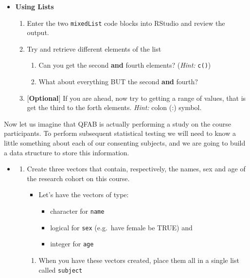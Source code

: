 \documentclass[a4paper]{book}
\providecommand{\tightlist}{%
  \setlength{\itemsep}{0pt}\setlength{\parskip}{0pt}}
\newenvironment{rmdblock}[1]
  {\vspace{1.5em}\begin{shaded*}
  \begin{itemize}
  \renewcommand{\labelitemi}{
    \raisebox{-.7\height}[0pt][0pt]{
      {\setkeys{Gin}{width=3em,keepaspectratio}\texttt{[image: images/\#1]}}
    }
  }
  \item
  }
  {
  \end{itemize}
  \end{shaded*}
  }
\newenvironment{rmdexercise}
  {\begin{rmdblock}{exercise}}
  {\end{rmdblock}}
\begin{document}
\begin{rmdexercise}
\textbf{Using Lists}

\begin{enumerate}
\def\labelenumi{\arabic{enumi}.}
\item
  Enter the two \texttt{mixedList} code blocks into RStudio and review
  the output.
\item
  Try and retrieve different elements of the list

  \begin{enumerate}
  \def\labelenumii{\alph{enumii})}
  \tightlist
  \item
    Can you get the second \textbf{and} fourth elements? (\emph{Hint:}
    \texttt{c()})
  \item
    What about everything BUT the second \textbf{and} fourth?
  \end{enumerate}
\item
  {[}\textbf{Optional}{]} If you are ahead, now try to getting a range
  of values, that is get the third to the forth elements. \emph{Hint:}
  colon (:) symbol.
\end{enumerate}
\end{rmdexercise}

Now let us imagine that QFAB is actually performing a study on the
course participants. To perform subsequent statistical testing we will
need to know a little something about each of our consenting subjects,
and we are going to build a data structure to store this information.

\begin{rmdexercise}
\begin{enumerate}
\def\labelenumi{\arabic{enumi}.}
\setcounter{enumi}{2}
\item
  Create three vectors that contain, respectively, the names, sex and
  age of the research cohort on this course.

  \begin{itemize}
  \tightlist
  \item
    Let's have the vectors of type:

    \begin{itemize}
    \tightlist
    \item
      character for \texttt{name}
    \item
      logical for \texttt{sex} (e.g.~have female be TRUE) and
    \item
      integer for \texttt{age}
    \end{itemize}
  \end{itemize}

  \begin{enumerate}
  \def\labelenumii{\alph{enumii})}
  \tightlist
  \item
    When you have these vectors created, place them all in a single list
    called \texttt{subject}
  \end{enumerate}
\end{enumerate}
\end{rmdexercise}
\end{document}
